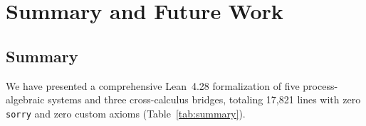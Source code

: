 \documentclass[11pt]{article}
\theoremstyle{definition}
\theoremstyle{remark}
\begin{document}
\section{Summary and Future Work}
\label{sec:conclusion}

\subsection{Summary}

We have presented a comprehensive Lean~4.28 formalization of five
process-algebraic systems and three cross-calculus bridges, totaling
17{,}821 lines with zero \texttt{sorry} and zero custom axioms
(Table~\ref{tab:summary}).
\end{document}
